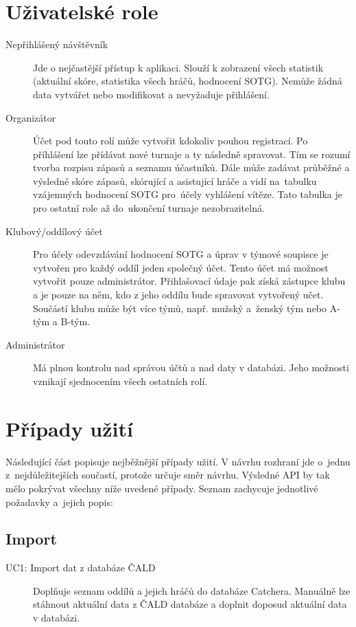 \section{Uživatelské role}

\begin{description}
  \item[Nepřihlášený návštěvník]
    Jde o nejčastější přístup k aplikaci. Slouží k zobrazení všech statistik (aktuální skóre,
    statistika všech hráčů, hodnocení SOTG). Nemůže žádná data vytvářet nebo modifikovat
    a nevyžaduje přihlášení.
  \item[Organizátor]
    Účet pod touto rolí může vytvořit kdokoliv pouhou registrací. Po příhlášení lze přídávat
    nové turnaje a ty následně spravovat. Tím se rozumí tvorba rozpisu zápasů a seznamu účastníků.
    Dále může zadávat průběžné a výsledné skóre zápasů, skórující a asistující hráče a vidí
    na~tabulku vzájemných hodnocení SOTG pro~účely vyhlášení vítěze.
    Tato tabulka je pro ostatní role až do~ukončení turnaje nezobrazitelná.
  \item[Klubový/oddílový účet]
    Pro účely odevzdávání hodnocení SOTG a úprav v týmové soupisce je vytvořen pro každý oddíl
    jeden společný účet. Tento účet má možnost vytvořit pouze administrátor. Přihlašovací údaje pak
    získá zástupce klubu a je pouze na něm, kdo z jeho oddílu bude spravovat vytvořený učet.
    Součástí klubu může být více týmů, např. mužský a~ženský tým nebo A-tým a B-tým.
  \item[Administrátor]
    Má plnou kontrolu nad správou účtů a nad daty v databázi.
    Jeho možnosti vznikají sjednocením všech ostatních rolí.
\end{description}

\section{Případy užití}
\label{sec:use_case}

Následující část popisuje nejběžnější případy užití. V návrhu rozhraní jde
o~jednu z~nejdůležitejších součastí, protože určuje směr návrhu. Výsledné API by tak mělo
pokrývat všechny níže uvedené případy. Seznam zachycuje jednotlivé požadavky
a~jejich popis:

\subsection*{Import}
  \begin{description}
    \item[UC1: Import dat z databáze ČALD]
      Doplňuje seznam oddílů a jejich hrá\-čů do databáze Catchera. Manuálně lze stáhnout
      aktuální data z ČALD databáze a doplnit doposud aktuální data v databázi.
  \end{description}

